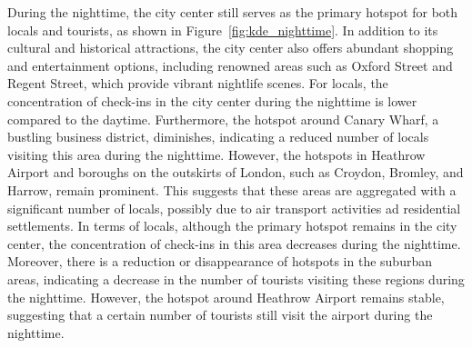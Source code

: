 \documentclass{article}
\begin{document}
During the nighttime, the city center still serves as the primary hotspot for both locals and tourists, as shown in Figure~\ref{fig:kde_nighttime}. In addition to its cultural and historical attractions, the city center also offers abundant shopping and entertainment options, including renowned areas such as Oxford Street and Regent Street, which provide vibrant nightlife scenes. For locals, the concentration of check-ins in the city center during the nighttime is lower compared to the daytime. Furthermore, the hotspot around Canary Wharf, a bustling business district, diminishes, indicating a reduced number of locals visiting this area during the nighttime. However, the hotspots in Heathrow Airport and boroughs on the outskirts of London, such as Croydon, Bromley, and Harrow, remain prominent. This suggests that these areas are aggregated with a significant number of locals, possibly due to air transport activities ad residential settlements. In terms of locals, although the primary hotspot remains in the city center, the concentration of check-ins in this area decreases during the nighttime. Moreover, there is a reduction or disappearance of hotspots in the suburban areas, indicating a decrease in the number of tourists visiting these regions during the nighttime. However, the hotspot around Heathrow Airport remains stable, suggesting that a certain number of tourists still visit the airport during the nighttime.
\end{document}
